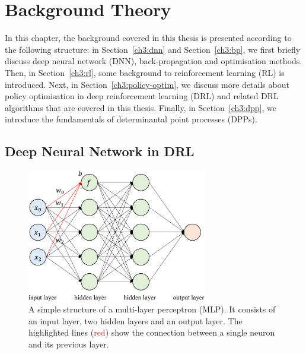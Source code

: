 \chapter{Background Theory}

\label{ch:background}
In this chapter, the background covered in this thesis is presented according to the following structure: in Section~\ref{ch3:dnn} and Section~\ref{ch3:bp}, we first briefly discuss deep neural network (DNN), back-propagation and optimisation methods. Then, in Section~\ref{ch3:rl}, some background to reinforcement learning (RL) is introduced. Next, in Section~\ref{ch3:policy-optim}, we discuss more details about policy optimisation in deep reinforcement learning (DRL) and related DRL algorithms that are covered in this thesis. Finally, in Section~\ref{ch3:dpp}, we introduce the fundamentals of determinantal point processes (DPPs).

\section{Deep Neural Network in DRL}
\begin{figure}[h]
    \centering
    \includegraphics[width=0.7\textwidth]{figures/background/mlp_background.pdf}
    \caption{A simple structure of a multi-layer perceptron (MLP). It consists of an input layer, two hidden layers and an output layer. The highlighted lines (\textcolor{red}{red}) show the connection between a single neuron and its previous layer.}
    \label{fig:nn}
\end{figure}
\label{ch3:dnn}
